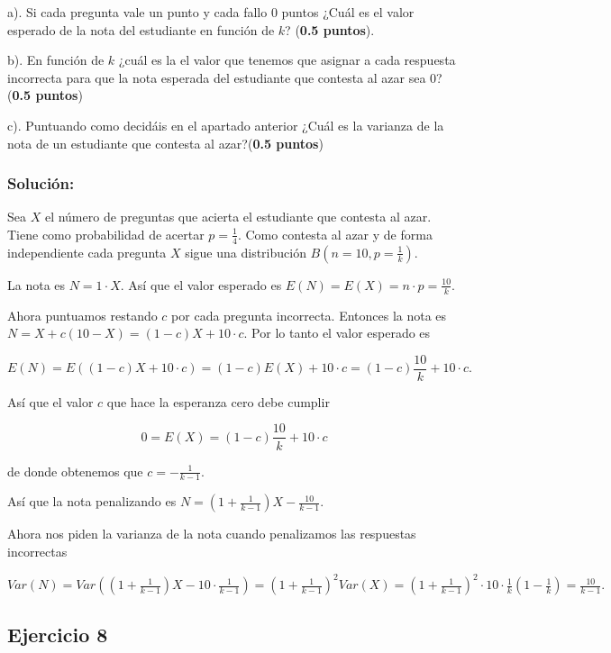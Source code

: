\documentclass[]{article}
\begin{document}
a). Si cada pregunta vale un punto y cada fallo 0 puntos ¿Cuál es el
valor esperado de la nota del estudiante en función de \(k\)?
(\textbf{0.5 puntos}).

b). En función de \(k\) ¿cuál es la el valor que tenemos que asignar a
cada respuesta incorrecta para que la nota esperada del estudiante que
contesta al azar sea \(0\)? (\textbf{0.5 puntos})

c). Puntuando como decidáis en el apartado anterior ¿Cuál es la varianza
de la nota de un estudiante que contesta al azar?(\textbf{0.5 puntos})

\hypertarget{soluciuxf3n-6}{%
\subsubsection{Solución:}\label{soluciuxf3n-6}}

Sea \(X\) el número de preguntas que acierta el estudiante que contesta
al azar. Tiene como probabilidad de acertar \(p=\frac{1}{4}\). Como
contesta al azar y de forma independiente cada pregunta \(X\) sigue una
distribución \(B(n=10,p=\frac{1}{k})\).

La nota es \(N=1\cdot X\). Así que el valor esperado es
\(E(N)=E(X)=n\cdot p=\frac{10}{k}.\)

Ahora puntuamos restando \(c\) por cada pregunta incorrecta. Entonces la
nota es \(N=X+c (10-X)=(1-c) X+10\cdot c\). Por lo tanto el valor
esperado es

\[E(N)=E((1-c) X+10\cdot  c)=(1-c) E(X)+10\cdot c=(1-c)\frac{10}{k}+10\cdot c.\]

Así que el valor \(c\) que hace la esperanza cero debe cumplir

\[0=E(X)=(1-c)\frac{10}{k}+10\cdot c\]

de donde obtenemos que \(c=-\frac{1}{k-1}\).

Así que la nota penalizando es
\(N=\left(1+\frac{1}{k-1}\right) X-\frac{10}{k-1}.\)

Ahora nos piden la varianza de la nota cuando penalizamos las respuestas
incorrectas

\(Var(N)=Var\left(\left(1+\frac{1}{k-1}\right) X-10\cdot\frac{1}{k-1}\right)=\left(1+\frac{1}{k-1}\right)^2 Var(X)= \left(1+\frac{1}{k-1}\right)^2\cdot 10\cdot \frac{1}{k} \left(1-\frac{1}{k}\right)=\frac{10}{k-1}.\)

\hypertarget{ejercicio-8}{%
\subsection{Ejercicio 8}\label{ejercicio-8}}
\end{document}
